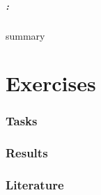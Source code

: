 \documentclass[9pt,xcolor=table]{beamer}
\begin{document}
\begin{frame}
\frametitle{\insertsectionhead{}: \insertsubsectionhead{}}
summary
\end{frame}

\part{Exercises}
\section{Tasks}
\section{Results}

\section{Literature}
\begin{frame}[c]
\frametitle{\insertsection{}}
\nocite{*}
\tiny%


\end{frame}
\end{document}
